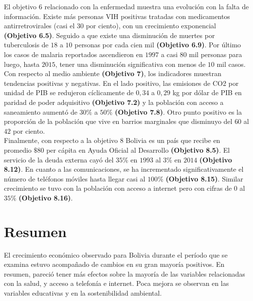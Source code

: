El objetivo 6 relacionado con la enfermedad muestra una evolución  con la falta de información. Existe  más personas VIH positivas tratadas con medicamentos antirretrovirales (casi el $30$ por ciento), con un crecimiento  exponencial \textbf{(Objetivo 6.5)}. Seguido a que existe una disminución de muertes por tuberculosis de $18$ a $10$ personas por cada cien mil \textbf{(Objetivo 6.9)}. Por último los casos de malaria reportados ascendieron en $1997$ a casi $80$ mil personas para luego, hasta $2015$, tener una disminución significativa con menos de $10$ mil casos.\\
Con respecto al medio ambiente \textbf{(Objetivo 7)}, los indicadores muestran tendencias positivas y negativas. En el lado positivo, las emisiones de CO2 por unidad de PIB se redujeron cíclicamente de $0,34$ a $0,29$ kg por dólar de PIB en paridad de poder adquisitivo \textbf{(Objetivo 7.2)} y la población con acceso a saneamiento aumentó de $30 \%$ a $50 \%$ \textbf{(Objetivo 7.8)}. Otro punto positivo es la proporción de la población que vive en barrios marginales que disminuyo del $60$ al $42$ por ciento.\\
Finalmente, con respecto a la objetivo 8 Bolivia es un país que recibe en promedio  $\$ 80$ per cápita en Ayuda Oficial al Desarrollo \textbf{(Objetivo 8.5)}. El servicio de la deuda externa cayó del $35 \%$ en $1993$ al $3 \%$ en $2014$ \textbf{(Objetivo 8.12)}. En cuanto a las comunicaciones, se ha incrementado significativamente el número de teléfonos móviles hasta llegar casi al $100 \%$ \textbf{(Objetivo 8.15)}. Similar crecimiento se tuvo con la población con acceso a internet pero con cifras de $0$ al $35\%$ \textbf{(Objetivo 8.16)}. 


\section{Resumen}
El crecimiento económico observado para Bolivia durante el período que se examina estuvo acompañado de cambios en su gran mayoría positivos. En resumen, pareció tener más efectos sobre la mayoría de las variables relacionadas con la salud, y acceso a telefonía e internet.  Poca mejora se  observan  en las variables educativas  y en la sostenibilidad ambiental.




